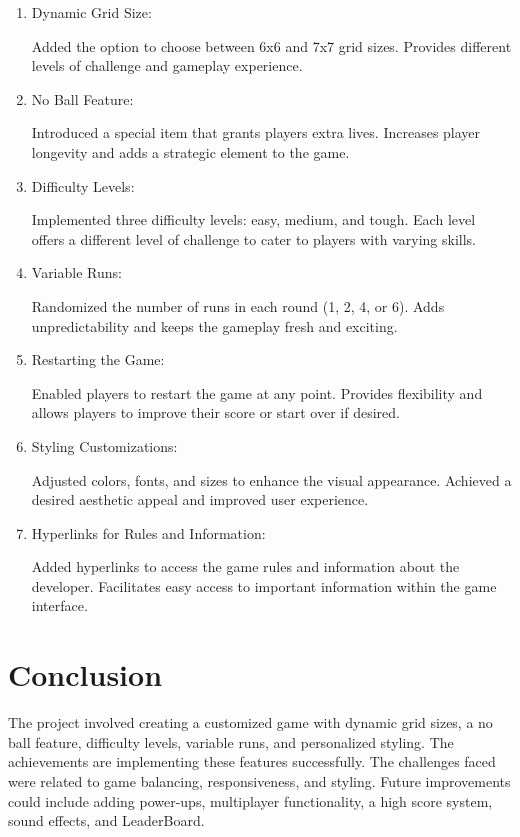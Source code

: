 \documentclass{article}
\begin{document}
\begin{enumerate}
  \item Dynamic Grid Size:
  
  Added the option to choose between 6x6 and 7x7 grid sizes.
  Provides different levels of challenge and gameplay experience.

  \item No Ball Feature:
  
  Introduced a special item that grants players extra lives.
  Increases player longevity and adds a strategic element to the game.

  \item Difficulty Levels:
  
  Implemented three difficulty levels: easy, medium, and tough.
  Each level offers a different level of challenge to cater to players with varying skills.

  \item Variable Runs:
  
  Randomized the number of runs in each round (1, 2, 4, or 6).
  Adds unpredictability and keeps the gameplay fresh and exciting.

  \item Restarting the Game:
  
  Enabled players to restart the game at any point.
  Provides flexibility and allows players to improve their score or start over if desired.

  \item Styling Customizations:
  
  Adjusted colors, fonts, and sizes to enhance the visual appearance.
  Achieved a desired aesthetic appeal and improved user experience.

  \item Hyperlinks for Rules and Information:
  
  Added hyperlinks to access the game rules and information about the developer.
  Facilitates easy access to important information within the game interface.
\end{enumerate}

\section*{Conclusion}

The project involved creating a customized game with dynamic grid sizes, a no ball feature, difficulty levels, variable runs, and personalized styling. The achievements are implementing these features successfully. The challenges faced were related to game balancing, responsiveness, and styling. Future improvements could include adding power-ups, multiplayer functionality, a high score system, sound effects, and LeaderBoard.
\newpage


\end{document}

